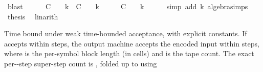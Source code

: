 \begin{isabellebody}
\ blast\isanewline
\ \ \isamarkupfalse%
\ {\isachardoublequoteopen}{\isacharparenleft}{\kern0pt}{}\ {\isacharasterisk}{\kern0pt}\ C\ {\isacharplus}{\kern0pt}\ {}{\isacharparenright}{\kern0pt}\ {\isacharasterisk}{\kern0pt}\ k\ {\isacharequal}{\kern0pt}\ C\ {\isacharasterisk}{\kern0pt}\ {\isacharparenleft}{\kern0pt}{}\ {\isacharasterisk}{\kern0pt}\ k\ {\isacharplus}{\kern0pt}\ {}{\isacharparenright}{\kern0pt}\ {\isacharplus}{\kern0pt}\ {}\ {\isacharplus}{\kern0pt}\ {\isacharparenleft}{\kern0pt}C\ {\isacharplus}{\kern0pt}\ {}{\isacharparenright}{\kern0pt}\ {\isacharasterisk}{\kern0pt}\ k{}{\isachardoublequoteclose}\isanewline
\ \ \ \ \isamarkupfalse%
\ {\isacharparenleft}{\kern0pt}simp\ add{\isacharcolon}{\kern0pt}\ k\ algebra{\isacharunderscore}{\kern0pt}simps{\isacharparenright}{\kern0pt}\isanewline
\ \ \isamarkupfalse%
\ {\isacharquery}{\kern0pt}thesis\ \isamarkupfalse%
\ linarith\isanewline
{}\isamarkupfalse%
%
\endisatagproof
{\isafoldproof}%
%
\isadelimproof
%
\endisadelimproof
%
\begin{isamarkuptext}%
Time bound under weak time-bounded acceptance, with explicit
  constants.  If  accepts  within  steps, the output
  machine accepts the encoded input within
   steps, where
   is the per-symbol block length (in
   cells) and  is
  the tape count.  The exact per--step super-step count is
  , folded up to  using

\end{isamarkuptext}
\end{isabellebody}
